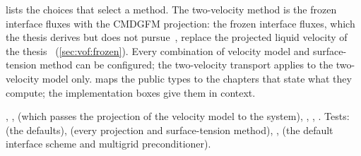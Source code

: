  lists the choices that select a method. The
two-velocity method is the frozen interface fluxes with the CMDGFM
projection: the frozen interface fluxes, which the thesis
derives but does not pursue~, replace the projected
liquid velocity of the thesis~
(\cref{sec:vof:frozen}). Every
combination of velocity model and surface-tension method can be configured;
the two-velocity transport applies to the two-velocity model only.
 maps the public types to the chapters that
state what they compute; the implementation boxes give them in context.

\begin{implnote}
,
,
 (which
passes the projection of the velocity model to the system),
,
,
. Tests:
(the defaults),
(every projection and surface-tension method),
,
(the default interface scheme and multigrid preconditioner).
\end{implnote}

